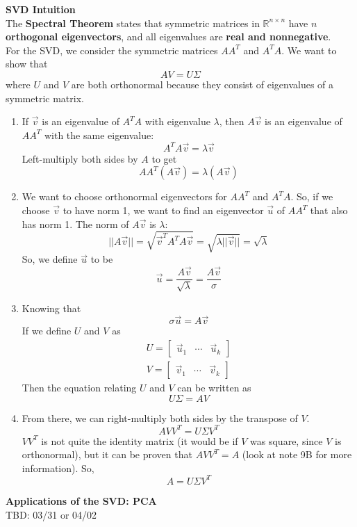 \textbf{SVD Intuition} \\
\newline
The \textbf{Spectral Theorem} states that symmetric matrices in $\mathbb{R}^{n\times n}$ have $n$ \textbf{orthogonal eigenvectors}, and all eigenvalues are \textbf{real and nonnegative}. \\
\newline
For the SVD, we consider the symmetric matrices $AA^T$ and $A^T A$. We want to show that
$$AV = U\Sigma$$
where $U$ and $V$ are both orthonormal because they consist of eigenvalues of a symmetric matrix.
\begin{enumerate}
    \item If $\vec{v}$ is an eigenvalue of $A^T A$ with eigenvalue $\lambda$, then $A\vec{v}$ is an eigenvalue of $AA^T$ with the same eigenvalue:
    $$A^T A \vec{v} = \lambda \vec{v}$$
    Left-multiply both sides by $A$ to get
    $$A A^T (A \vec{v}) = \lambda (A \vec{v})$$
    \item We want to choose orthonormal eigenvectors for $AA^T$ and $A^T A$. 
    So, if we choose $\vec{v}$ to have norm 1, we want to find an eigenvector $\vec{u}$ of $AA^T$ that also has norm 1. 
    The norm of $A \vec{v}$ is $\lambda$:
    $$||A\vec{v}|| = \sqrt{\vec{v}^T A^T A \vec{v}} = \sqrt{\lambda ||\vec{v}||} = \sqrt{\lambda}$$
    So, we define $\vec{u}$ to be
    $$\vec{u} = \frac{A \vec{v}}{\sqrt{\lambda}} = \frac{A \vec{v}}{\sigma}$$
    \item Knowing that 
    $$\sigma \vec{u} = A \vec{v}$$
    If we define $U$ and $V$ as
    \begin{align*}
        U = \begin{bmatrix} \vec{u}_1 & \cdots & \vec{u}_k \end{bmatrix} \\
        V = \begin{bmatrix} \vec{v}_1 & \cdots & \vec{v}_k \end{bmatrix}
    \end{align*}
    Then the equation relating $U$ and $V$ can be written as
    $$U\Sigma = AV$$
    \item From there, we can right-multiply both sides by the transpose of $V$. 
    $$AVV^T = U \Sigma V^T$$
    $VV^T$ is not quite the identity matrix (it would be if $V$ was square, since $V$ is orthonormal), but it can be proven that $AVV^T = A$ (look at note 9B for more information). So,
    $$A = U \Sigma V^T$$
\end{enumerate}

\textbf{Applications of the SVD: PCA} \\
\newline
TBD: 03/31 or 04/02